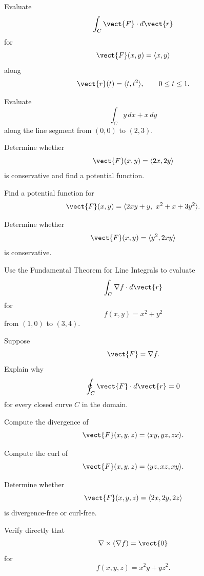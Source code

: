 \begin{exercise}[2]
Evaluate
\[ \int_C\vect{F}\cdot d\vect{r} \]
for
\[ \vect{F}(x,y)=\langle x,y\rangle \]
along
\[ \vect{r}(t)=\langle t,t^2\rangle,\qquad0\leq t\leq1. \]
\end{exercise}

\begin{exercise}[2]
Evaluate
\[ \int_C y\,dx+x\,dy \]
along the line segment from \((0,0)\) to \((2,3)\).
\end{exercise}

\begin{exercise}[1]
Determine whether
\[ \vect{F}(x,y)=\langle2x,2y\rangle \]
is conservative and find a potential function.
\end{exercise}

\begin{exercise}[2]
Find a potential function for
\[ \vect{F}(x,y)=\langle2xy+y,\ x^2+x+3y^2\rangle. \]
\end{exercise}

\begin{exercise}[2]
Determine whether
\[ \vect{F}(x,y)=\langle y^2,2xy\rangle \]
is conservative.
\end{exercise}

\begin{exercise}[2]
Use the Fundamental Theorem for Line Integrals to evaluate
\[ \int_C\nabla f\cdot d\vect{r} \]
for
\[ f(x,y)=x^2+y^2 \]
from \((1,0)\) to \((3,4)\).
\end{exercise}

\begin{exercise}[2]
Suppose
\[ \vect{F}=\nabla f. \]
Explain why
\[ \oint_C\vect{F}\cdot d\vect{r}=0 \]
for every closed curve \(C\) in the domain.
\end{exercise}

\begin{exercise}[2]
Compute the divergence of
\[ \vect{F}(x,y,z)=\langle xy,yz,zx\rangle. \]
\end{exercise}

\begin{exercise}[2]
Compute the curl of
\[ \vect{F}(x,y,z)=\langle yz,xz,xy\rangle. \]
\end{exercise}

\begin{exercise}[2]
Determine whether
\[ \vect{F}(x,y,z)=\langle2x,2y,2z\rangle \]
is divergence-free or curl-free.
\end{exercise}

\begin{exercise}[2]
Verify directly that
\[ \nabla\times(\nabla f)=\vect{0} \]
for
\[ f(x,y,z)=x^2y+yz^2. \]
\end{exercise}

